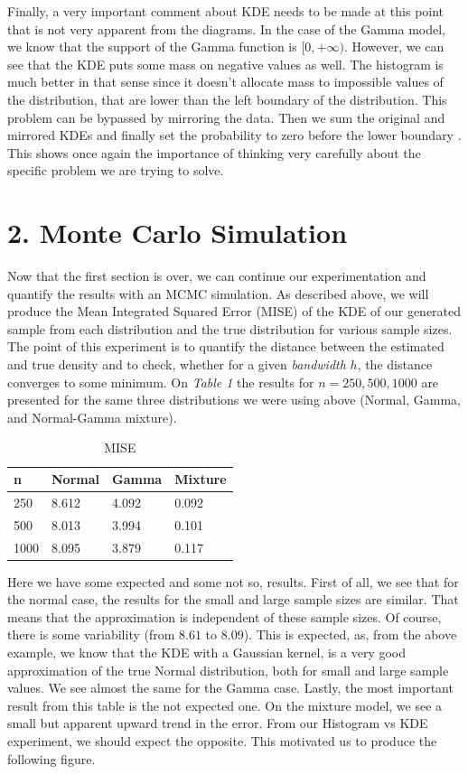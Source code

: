 \documentclass[fleqn, a4paper]{report}
\begin{document}
Finally, a very important comment about KDE needs to be made at this point that is not very apparent from the diagrams. In the case of the Gamma model, we know that the support of the Gamma function is $[0, +\infty)$. However, we can see that the KDE puts some mass on negative values as well. The histogram is much better in that sense since it doesn't allocate mass to impossible values of the distribution, that are lower than the left boundary of the distribution. This problem can be bypassed by mirroring the data. Then we sum the original and mirrored KDEs and finally set the probability to zero before the lower boundary \cite{kang2018kernel}. This shows once again the importance of thinking very carefully about the specific problem we are trying to solve.


\section*{2. Monte Carlo Simulation}
Now that the first section is over, we can continue our experimentation and quantify the results with an MCMC simulation. As described above, we will produce the Mean Integrated Squared Error (MISE) of the KDE of our generated sample from each distribution and the true distribution for various sample sizes. The point of this experiment is to quantify the distance between the estimated and true density and to check, whether for a given \textit{bandwidth} $h$, the distance converges to some minimum. On \textit{Table 1} the results for $n=250,500,1000$ are presented for the same three distributions we were using above (Normal, Gamma, and Normal-Gamma mixture). 

\begin{table}[]
\centering
\begin{tabular}{|l|lll|}
\hline
n & Normal & Gamma & Mixture \\ \hline
250 & 8.612 & 4.092 & 0.092 \\
500 & 8.013 & 3.994 & 0.101 \\
1000 & 8.095 & 3.879 & 0.117 \\ \hline
\end{tabular}
\caption{MISE}
\label{tab:table_1}
\end{table}

Here we have some expected and some not so, results. First of all, we see that for the normal case, the results for the small and large sample sizes are similar. That means that the approximation is independent of these sample sizes. Of course, there is some variability (from $8.61$ to $8.09$). This is expected, as, from the above example, we know that the KDE with a Gaussian kernel, is a very good approximation of the true Normal distribution, both for small and large sample values. We see almost the same for the Gamma case. Lastly, the most important result from this table is the not expected one. On the mixture model, we see a small but apparent upward trend in the error. From our Histogram vs KDE experiment, we should expect the opposite. This motivated us to produce the following figure. 
\end{document}

